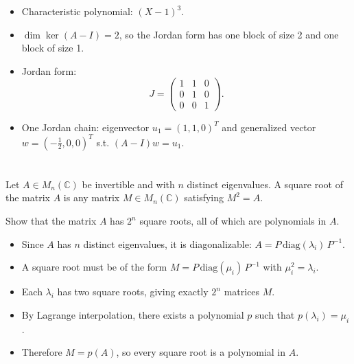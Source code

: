 \documentclass[12pt]{article}
\begin{document}
\begin{answerbox}
\begin{itemize}
\item Characteristic polynomial: $(X-1)^3$.
\item $\dim\ker(A-I)=2$, so the Jordan form has one block of size 2 and one block of size 1.
\item Jordan form:
\[
J = \begin{pmatrix}1&1&0\\0&1&0\\0&0&1\end{pmatrix}.
\]
\item One Jordan chain: eigenvector $u_1=(1,1,0)^T$ and generalized vector $w=(-\tfrac12,0,0)^T$ s.t. $(A-I)w=u_1$.
\end{itemize}
\end{answerbox}

\section{}
Let $A \in M_n(\mathbb{C})$ be invertible and with $n$ distinct eigenvalues.  
A square root of the matrix $A$ is any matrix $M \in M_n(\mathbb{C})$ satisfying $M^2 = A$.

Show that the matrix $A$ has $2^n$ square roots, all of which are polynomials in $A$.

\begin{answerbox}
\begin{itemize}
\item Since $A$ has $n$ distinct eigenvalues, it is diagonalizable: $A = P\,\mathrm{diag}(\lambda_i)\,P^{-1}$.
\item A square root must be of the form $M = P\,\mathrm{diag}(\mu_i)\,P^{-1}$ with $\mu_i^2 = \lambda_i$.
\item Each $\lambda_i$ has two square roots, giving exactly $2^n$ matrices $M$.
\item By Lagrange interpolation, there exists a polynomial $p$ such that $p(\lambda_i)=\mu_i$.
\item Therefore $M=p(A)$, so every square root is a polynomial in $A$.
\end{itemize}
\end{answerbox}

\end{document}
